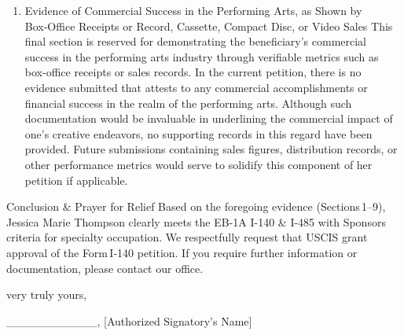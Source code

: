 \begin{enumerate}
\item Evidence of Commercial Success in the Performing Arts, as Shown by Box‑Office Receipts or Record, Cassette, Compact Disc, or Video Sales
This final section is reserved for demonstrating the beneficiary’s commercial success in the performing arts industry through verifiable metrics such as box-office receipts or sales records. In the current petition, there is no evidence submitted that attests to any commercial accomplishments or financial success in the realm of the performing arts. Although such documentation would be invaluable in underlining the commercial impact of one’s creative endeavors, no supporting records in this regard have been provided. Future submissions containing sales figures, distribution records, or other performance metrics would serve to solidify this component of her petition if applicable.

\end{enumerate}

Conclusion \& Prayer for Relief
Based on the foregoing evidence (Sections 1–9), Jessica Marie Thompson clearly meets the EB-1A I-140 \& I-485 with Sponsors criteria for specialty occupation. We respectfully request that USCIS grant approval of the Form I‑140 petition. If you require further information or documentation, please contact our office.

very truly yours,

\_\_\_\_\_\_\_\_\_\_\_,
[Authorized Signatory’s Name]